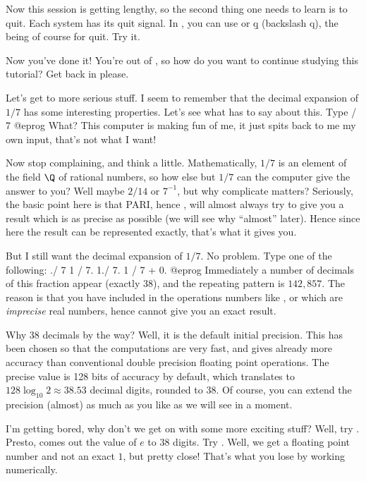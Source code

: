 Now this session is getting lengthy, so the second thing one needs to learn
is to quit. Each system has its quit signal. In , you can use
 or \b{q} (backslash q), the  being of course for quit.
Try it.

Now you've done it! You're out of , so how do you want to continue
studying this tutorial? Get back in please.

Let's get to more serious stuff. I seem to remember that the decimal
expansion of $1/7$ has some interesting properties. Let's see what 
has to say about this. Type
 / 7
@eprog\noindent
What? This computer is making fun of me, it just spits back to me my own
input, that's not what I want!

Now stop complaining, and think a little. Mathematically, $1/7$ is an element
of the field $\Q$ of rational numbers, so how else but $1/7$ can the computer
give the answer to you? Well maybe $2/14$ or $7^{-1}$, but why complicate
matters? Seriously, the basic point here is that PARI, hence , will
almost always try to give you a result which is as precise as possible (we
will see why ``almost'' later). Hence since here the result can be
represented exactly, that's what it gives you.

But I still want the decimal expansion of $1/7$. No problem. Type one of
the following:
./ 7
  1 / 7.
  1./ 7.
  1 / 7 + 0.
@eprog\noindent
Immediately a number of decimals of this fraction appear (exactly 38), and
the repeating pattern is $142,857$. The reason is that you have included in
the operations numbers like ,  or  which are
\emph{imprecise} real numbers, hence  cannot give you an exact
result.

Why 38 decimals by the way? Well, it is the default initial precision.
This has been chosen so that the computations are very fast, and gives
already more accuracy than conventional double precision floating
point operations. The precise value is 128 bits of accuracy by default,
which translates to $128 \log_{10}2 \approx 38.53$ decimal digits, rounded to
$38$. Of course, you can extend the precision (almost) as much as you like as
we will see in a moment.

I'm getting bored, why don't we get on with some more exciting stuff?  Well,
try . Presto, comes out the value of $e$ to 38 digits. Try
. Well, we get a floating point number and not an exact $1$,
but pretty close! That's what you lose by working numerically.

